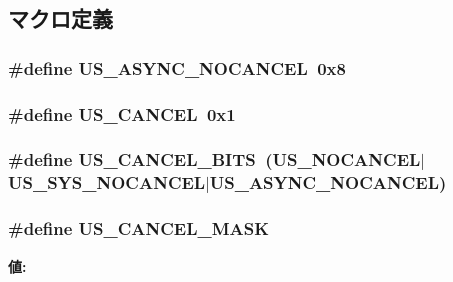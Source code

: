 \subsection{マクロ定義}
\hypertarget{kern_2tru64_2tru64_8hh_a8fb59dd3e825f2e645ccd2708ec6153c}{
\subsubsection[{US\_\-ASYNC\_\-NOCANCEL}]{\setlength{\rightskip}{0pt plus 5cm}\#define US\_\-ASYNC\_\-NOCANCEL~0x8}}
\label{kern_2tru64_2tru64_8hh_a8fb59dd3e825f2e645ccd2708ec6153c}
\hypertarget{kern_2tru64_2tru64_8hh_a3ee52ec290fe142e43267b7bc43dc2f1}{
\subsubsection[{US\_\-CANCEL}]{\setlength{\rightskip}{0pt plus 5cm}\#define US\_\-CANCEL~0x1}}
\label{kern_2tru64_2tru64_8hh_a3ee52ec290fe142e43267b7bc43dc2f1}
\hypertarget{kern_2tru64_2tru64_8hh_aff7376b113f465e1313234392ac9a49a}{
\subsubsection[{US\_\-CANCEL\_\-BITS}]{\setlength{\rightskip}{0pt plus 5cm}\#define US\_\-CANCEL\_\-BITS~(US\_\-NOCANCEL$|$US\_\-SYS\_\-NOCANCEL$|$US\_\-ASYNC\_\-NOCANCEL)}}
\label{kern_2tru64_2tru64_8hh_aff7376b113f465e1313234392ac9a49a}
\hypertarget{kern_2tru64_2tru64_8hh_a346c9edb572174f9be6d764ea22df611}{
\subsubsection[{US\_\-CANCEL\_\-MASK}]{\setlength{\rightskip}{0pt plus 5cm}\#define US\_\-CANCEL\_\-MASK}}
\label{kern_2tru64_2tru64_8hh_a346c9edb572174f9be6d764ea22df611}
{\bfseries 値:}

